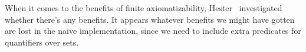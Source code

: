 \begin{node}\label{nbg-0003}%
When it comes to the benefits of finite axiomatizability,
Hester~\cite{hester2019automated} investigated whether there's any
benefits. It appears whatever benefits we might have gotten are lost in
the naive implementation, since we need to include extra predicates for
quantifiers over sets.
\end{node}

